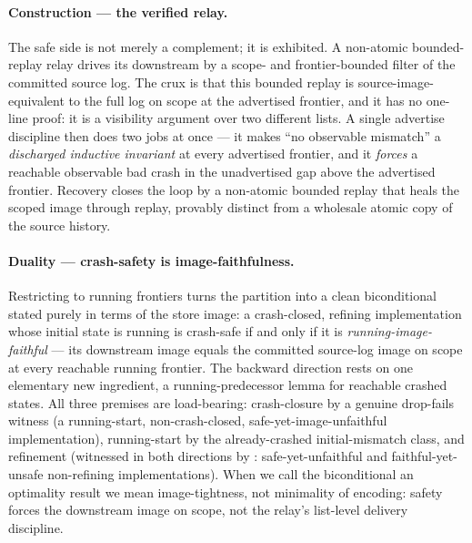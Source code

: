 \documentclass[11pt,a4paper]{article}
\begin{document}
\paragraph{Construction --- the verified relay.} The safe side is not merely a
complement; it is exhibited. A non-atomic bounded-replay relay drives its
downstream by a scope- and frontier-bounded filter of the committed source log.
The crux is that this bounded replay is source-image-equivalent to the full log
on scope at the advertised frontier, and it has no one-line proof: it is a
visibility argument over two different lists. A single advertise discipline then
does two jobs at once --- it makes ``no observable mismatch'' a \emph{discharged
inductive invariant} at every advertised frontier, and it \emph{forces} a
reachable observable bad crash in the unadvertised gap above the advertised
frontier. Recovery closes the loop by a non-atomic bounded replay that heals the
scoped image through replay, provably distinct from a wholesale atomic copy of
the source history.

\paragraph{Duality --- crash-safety is image-faithfulness.} Restricting to
running frontiers turns the partition into a clean biconditional stated purely in
terms of the store image: a crash-closed, refining implementation whose initial
state is running is crash-safe if and only if it is
\emph{running-image-faithful} --- its downstream image equals the committed
source-log image on scope at every reachable running frontier. The backward
direction rests on one elementary new ingredient, a running-predecessor lemma for
reachable crashed states. All three premises are load-bearing:
crash-closure by a genuine drop-fails witness (a running-start,
non-crash-closed, safe-yet-image-unfaithful implementation), running-start by the
already-crashed initial-mismatch class, and refinement
(witnessed in both directions by
:
safe-yet-unfaithful and faithful-yet-unsafe non-refining implementations).
When we call the biconditional an optimality result we mean image-tightness, not
minimality of encoding: safety forces the downstream image on scope, not the
relay's list-level delivery discipline.
\end{document}

